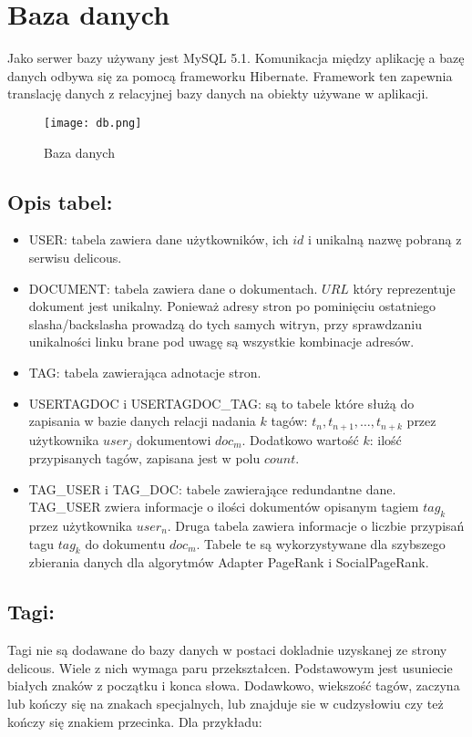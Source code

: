 \section{Baza danych}

Jako serwer bazy używany jest MySQL 5.1. Komunikacja między aplikację a bazę danych odbywa się za pomocą frameworku Hibernate. Framework ten zapewnia translację danych z relacyjnej bazy danych na obiekty używane w aplikacji. 


\begin{figure}[h]
\centering
\texttt{[image: db.png]}
\caption{Baza danych}
\label{fig:db_fig}
\end{figure}


\subsection*{Opis tabel:}
\begin{itemize}
	\item USER: tabela zawiera dane użytkowników, ich $id$ i unikalną nazwę pobraną z serwisu delicous.
	\item DOCUMENT: tabela zawiera dane o dokumentach. $URL$ który reprezentuje dokument jest unikalny. Ponieważ adresy stron po pominięciu ostatniego slasha/backslasha prowadzą do tych samych witryn, przy sprawdzaniu unikalności linku brane pod uwagę są wszystkie kombinacje adresów.
	\item TAG: tabela zawierająca adnotacje stron.
	\item USERTAGDOC i USERTAGDOC\_TAG: są to tabele które służą do zapisania w bazie danych relacji nadania $k$ tagów: $t_n, t_{n+1}, \dots, t_{n+k}$ przez użytkownika $user_j$  dokumentowi $doc_m$. Dodatkowo wartość $k$: ilość przypisanych tagów, zapisana jest w polu $count$.
	\item TAG\_USER i TAG\_DOC: tabele zawierające redundantne dane. TAG\_USER zwiera informacje o ilości dokumentów opisanym tagiem $tag_k$ przez użytkownika $user_n$. Druga tabela zawiera informacje o liczbie przypisań tagu $tag_k$ do dokumentu $doc_m$. Tabele te są wykorzystywane dla szybszego zbierania danych dla algorytmów Adapter PageRank i SocialPageRank.
\end{itemize}


\subsection*{Tagi:}
Tagi nie są dodawane do bazy danych w postaci dokladnie uzyskanej ze strony delicous. Wiele z nich wymaga paru przekształcen. Podstawowym jest usuniecie białych znaków z początku i konca słowa. Dodawkowo, wiekszość tagów, zaczyna lub kończy się na znakach specjalnych, lub znajduje sie w cudzysłowiu czy też kończy się znakiem przecinka. Dla przykładu:

